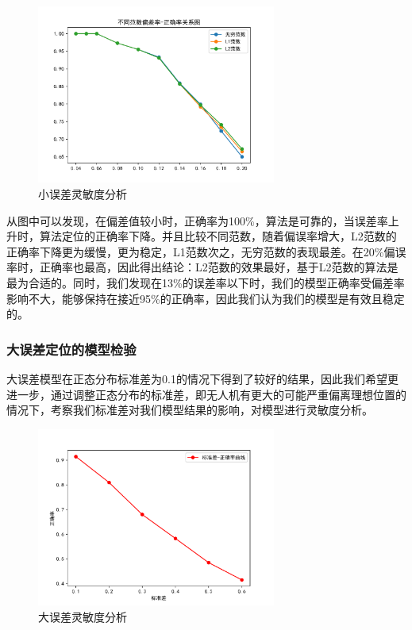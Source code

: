 \documentclass{my_paper}
\begin{document}
\begin{figure}[H]
    \centering
    \includegraphics[width=0.7\textwidth]{check2}
    \caption{小误差灵敏度分析} 
\end{figure}

从图中可以发现，在偏差值较小时，正确率为100\%，算法是可靠的，当误差率上升时，算法定位的正确率下降。并且比较不同范数，随着偏误率增大，L2范数的正确率下降更为缓慢，更为稳定，L1范数次之，无穷范数的表现最差。在20\%偏误率时，正确率也最高，因此得出结论：L2范数的效果最好，基于L2范数的算法是最为合适的。同时，我们发现在13\%的误差率以下时，我们的模型正确率受偏差率影响不大，能够保持在接近95\%的正确率，因此我们认为我们的模型是有效且稳定的。
\subsubsection{大误差定位的模型检验}

大误差模型在正态分布标准差为0.1的情况下得到了较好的结果，因此我们希望更进一步，通过调整正态分布的标准差，即无人机有更大的可能严重偏离理想位置的情况下，考察我们标准差对我们模型结果的影响，对模型进行灵敏度分析。

\begin{figure}[H]
    \centering
    \includegraphics[width=0.7\textwidth]{check22}
    \caption{大误差灵敏度分析} 
\end{figure}
\end{document}
